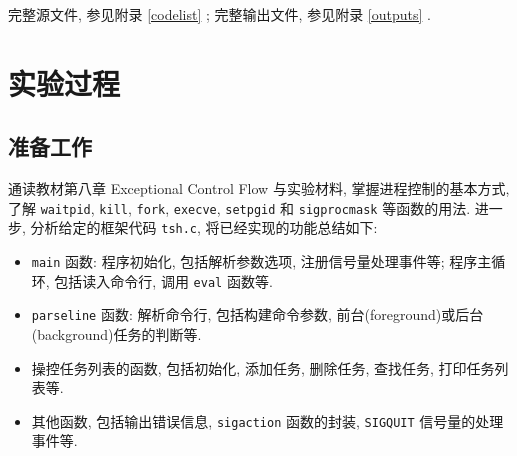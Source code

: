完整源文件, 参见附录 \ref{codelist} ; 完整输出文件, 参见附录 \ref{outputs} .

\section{实验过程}

\subsection{准备工作}

通读教材第八章 Exceptional Control Flow 与实验材料, 掌握进程控制的基本方式, 了解 \verb|waitpid|, \verb|kill|, \verb|fork|, \verb|execve|, \verb|setpgid| 和 \verb|sigprocmask| 等函数的用法. 进一步, 分析给定的框架代码 \verb|tsh.c|, 将已经实现的功能总结如下:
\begin{itemize}
    \item \verb|main| 函数: 程序初始化, 包括解析参数选项, 注册信号量处理事件等; 程序主循环, 包括读入命令行, 调用 \verb|eval| 函数等. 
    \item \verb|parseline| 函数: 解析命令行, 包括构建命令参数, 前台(foreground)或后台(background)任务的判断等.
    \item 操控任务列表的函数, 包括初始化, 添加任务, 删除任务, 查找任务, 打印任务列表等.
    \item 其他函数, 包括输出错误信息, \verb|sigaction| 函数的封装, \verb|SIGQUIT| 信号量的处理事件等.
\end{itemize}

